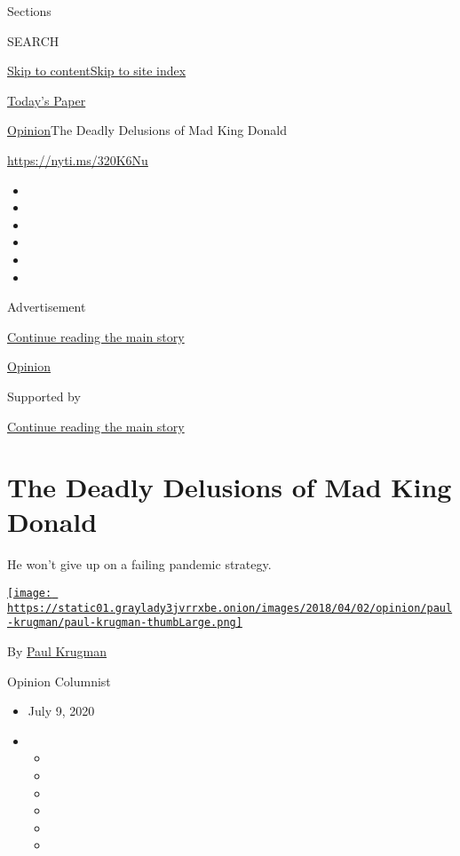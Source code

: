 Sections

SEARCH

\protect\hyperlink{site-content}{Skip to
content}\protect\hyperlink{site-index}{Skip to site index}

\href{https://myaccount.nytimes3xbfgragh.onion/auth/login?response_type=cookie\&client_id=vi}{}

\href{https://www.nytimes3xbfgragh.onion/section/todayspaper}{Today's
Paper}

\href{/section/opinion}{Opinion}\textbar{}The Deadly Delusions of Mad
King Donald

\url{https://nyti.ms/320K6Nu}

\begin{itemize}
\item
\item
\item
\item
\item
\item
\end{itemize}

Advertisement

\protect\hyperlink{after-top}{Continue reading the main story}

\href{/section/opinion}{Opinion}

Supported by

\protect\hyperlink{after-sponsor}{Continue reading the main story}

\hypertarget{the-deadly-delusions-of-mad-king-donald}{%
\section{The Deadly Delusions of Mad King
Donald}\label{the-deadly-delusions-of-mad-king-donald}}

He won't give up on a failing pandemic strategy.

\href{https://www.nytimes3xbfgragh.onion/by/paul-krugman}{\texttt{[image: https://static01.graylady3jvrrxbe.onion/images/2018/04/02/opinion/paul-krugman/paul-krugman-thumbLarge.png]}}

By \href{https://www.nytimes3xbfgragh.onion/by/paul-krugman}{Paul
Krugman}

Opinion Columnist

\begin{itemize}
\item
  July 9, 2020
\item
  \begin{itemize}
  \item
  \item
  \item
  \item
  \item
  \item
  \end{itemize}
\end{itemize}


